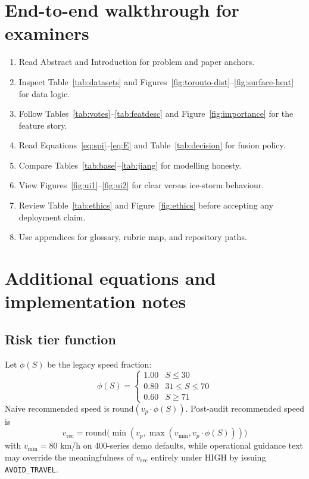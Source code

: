 \documentclass[11pt,a4paper]{article}
\begin{document}
\newpage
\section*{End-to-end walkthrough for examiners}
\label{sec:walkthrough}
\begin{enumerate}[leftmargin=1.5em]
  \item Read Abstract and Introduction for problem and paper anchors.
  \item Inspect Table~\ref{tab:datasets} and Figures~\ref{fig:toronto-dist}--\ref{fig:surface-heat} for data logic.
  \item Follow Tables~\ref{tab:votes}--\ref{tab:featdesc} and Figure~\ref{fig:importance} for the feature story.
  \item Read Equations~\eqref{eq:spi}--\eqref{eq:E} and Table~\ref{tab:decision} for fusion policy.
  \item Compare Tables~\ref{tab:base}--\ref{tab:jiang} for modelling honesty.
  \item View Figures~\ref{fig:ui1}--\ref{fig:ui2} for clear versus ice-storm behaviour.
  \item Review Table~\ref{tab:ethics} and Figure~\ref{fig:ethics} before accepting any deployment claim.
  \item Use appendices for glossary, rubric map, and repository paths.
\end{enumerate}

\newpage
\section*{Additional equations and implementation notes}
\subsection{Risk tier function}
Let $\phi(S)$ be the legacy speed fraction:
\begin{equation}
\phi(S)=\begin{cases}
1.00 & S\le 30\\
0.80 & 31\le S\le 70\\
0.60 & S\ge 71
\end{cases}
\end{equation}
Naive recommended speed is $\mathrm{round}(v_p\cdot\phi(S))$. Post-audit recommended speed is
\begin{equation}
v_{\mathrm{rec}}=\mathrm{round}\bigl(\min(v_p,\max(v_{\min}, v_p\cdot\phi(S)))\bigr)
\end{equation}
with $v_{\min}=80$ km/h on 400-series demo defaults, while operational guidance text may override the meaningfulness of $v_{\mathrm{rec}}$ entirely under HIGH by issuing \texttt{AVOID\_TRAVEL}.
\end{document}
